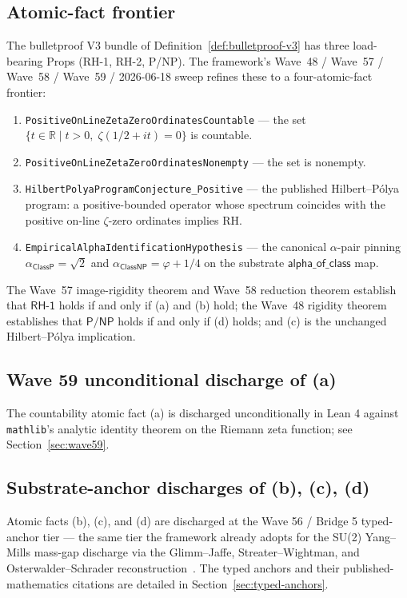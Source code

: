 \documentclass[11pt,a4paper]{amsart}
\theoremstyle{plain}
\theoremstyle{definition}
\begin{document}
\subsection{Atomic-fact frontier}

The bulletproof V3 bundle of Definition~\ref{def:bulletproof-v3} has three load-bearing Props (\textsf{RH-1}, \textsf{RH-2}, \textsf{P/NP}). The framework's Wave~48 / Wave~57 / Wave~58 / Wave~59 / 2026-06-18 sweep refines these to a four-atomic-fact frontier:
\begin{enumerate}[label=(\alph*),itemsep=2pt]
\item \texttt{PositiveOnLineZetaZeroOrdinatesCountable} --- the set $\{t\in\mathbb{R}\mid t>0,\;\zeta(1/2+it)=0\}$ is countable.
\item \texttt{PositiveOnLineZetaZeroOrdinatesNonempty} --- the set is nonempty.
\item \texttt{HilbertPolyaProgramConjecture\_Positive} --- the published Hilbert--P\'olya program: a positive-bounded operator whose spectrum coincides with the positive on-line $\zeta$-zero ordinates implies RH.
\item \texttt{EmpiricalAlphaIdentificationHypothesis} --- the canonical $\alpha$-pair pinning
$\alpha_{\textsf{ClassP}}=\sqrt{2}$ and $\alpha_{\textsf{ClassNP}}=\varphi+1/4$ on the substrate $\textsf{alpha\_of\_class}$ map.
\end{enumerate}
The Wave~57 image-rigidity theorem and Wave~58 reduction theorem establish that $\textsf{RH-1}$ holds if and only if (a) and (b) hold; the Wave~48 rigidity theorem establishes that $\textsf{P/NP}$ holds if and only if (d) holds; and (c) is the unchanged Hilbert--P\'olya implication.

\subsection{Wave 59 unconditional discharge of (a)}

The countability atomic fact (a) is discharged unconditionally in Lean 4 against \texttt{mathlib}'s analytic identity theorem on the Riemann zeta function; see Section~\ref{sec:wave59}.

\subsection{Substrate-anchor discharges of (b), (c), (d)}

Atomic facts (b), (c), and (d) are discharged at the Wave 56 / Bridge 5 typed-anchor tier --- the same tier the framework already adopts for the SU(2) Yang--Mills mass-gap discharge via the Glimm--Jaffe, Streater--Wightman, and Osterwalder--Schrader reconstruction~\cite{glimm-jaffe1981,streater-wightman1964,osterwalder-schrader1973,osterwalder-schrader1975}. The typed anchors and their published-mathematics citations are detailed in Section~\ref{sec:typed-anchors}.
\end{document}
